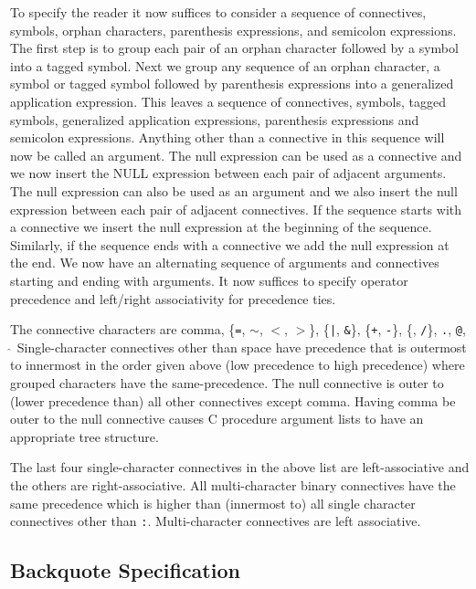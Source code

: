 \documentclass{article}
\newcommand{\mtt}[1]{\mbox{\tt #1}}
\begin{document}
To specify the reader it now suffices to consider a sequence of connectives, symbols, orphan characters,
parenthesis expressions, and semicolon expressions.
The first step is to group each pair of an orphan character followed by a symbol into a tagged symbol.
Next we group any sequence of an orphan character, a symbol or tagged symbol followed by parenthesis expressions
into a generalized application expression.  This leaves a sequence of connectives, symbols, tagged symbols, generalized application expressions,
parenthesis expressions and semicolon expressions.  Anything other than a connective in this sequence will now be called an argument.
The null expression can be used as a connective and
we now insert the NULL expression between each pair of adjacent arguments.  The null expression can also be used as an argument and we
also insert the null expression between each pair of adjacent connectives.
If the sequence starts with a connective we insert the null expression at the beginning of the sequence. Similarly, if the sequence ends with a connective
we add the null expression at the end.
We now have an alternating sequence of arguments and connectives starting and ending with arguments.
It now suffices to specify operator precedence and left/right associativity for precedence ties.

The connective characters are comma,
\{{\tt =}, {\tt $\sim$}, {\tt $<$}, {\tt $>$}\}, \{\mtt{|}, {\tt \&}\}, \{{\tt +}, {\tt -}\}, \{{\tt *}, {\tt /}\}, {\tt .}, {\tt @}, \mtt{$\hat{~}$}
Single-character connectives other than space have precedence that is outermost to innermost in the order given above (low
precedence to high precedence) where grouped characters have the same-precedence.
The null connective is outer to (lower precedence than) all other connectives except comma.  Having comma be outer to
the null connective causes C procedure argument lists to have an appropriate tree structure.

The last four single-character connectives in the above list are left-associative and the
others are right-associative. All multi-character binary connectives have the same
precedence which is higher than (innermost to) all single character connectives other than {\tt :}.
Multi-character connectives are left associative. 
  
\subsection{Backquote Specification}
\end{document}
